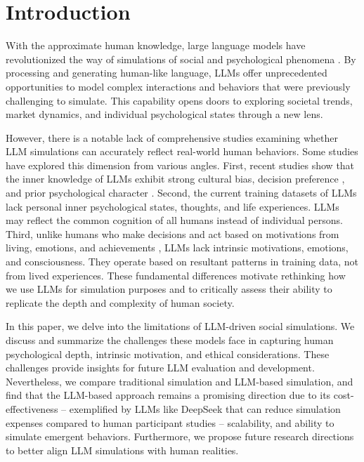 \section{Introduction} \label{intro}
With the approximate human knowledge, large language models have revolutionized the way of simulations of social and psychological phenomena \citep{Park2023GenerativeAgents, gao2023s}. By processing and generating human-like language, LLMs offer unprecedented opportunities to model complex interactions and behaviors that were previously challenging to simulate. This capability opens doors to exploring societal trends, market dynamics, and individual psychological states through a new lens.

However, there is a notable lack of comprehensive studies examining whether LLM simulations can accurately reflect real-world human behaviors. Some studies have explored this dimension from various angles. First, recent studies \citep{wang2023not, wang2024new, wang2025limits} show that the inner knowledge of LLMs exhibit strong cultural bias, decision preference \citep{huang2024far}, and prior psychological character \citep{pan2023llms}. Second, the current training datasets of LLMs lack personal inner psychological states, thoughts, and life experiences. LLMs may reflect the common cognition of all humans instead of individual persons. Third, unlike humans who make decisions and act based on motivations from living, emotions, and achievements \citep{felin2024theory}, LLMs lack intrinsic motivations, emotions, and consciousness. They operate based on resultant patterns in training data, not from lived experiences. These fundamental differences motivate rethinking how we use LLMs for simulation purposes and to critically assess their ability to replicate the depth and complexity of human society.

In this paper, we delve into the limitations of LLM-driven social simulations. We discuss and summarize the challenges these models face in capturing human psychological depth, intrinsic motivation, and ethical considerations. These challenges provide insights for future LLM evaluation and development. Nevertheless, we compare traditional simulation and LLM-based simulation, and find that the LLM-based approach remains a promising direction due to its cost-effectiveness – exemplified by LLMs like DeepSeek that can reduce simulation expenses compared to human participant studies \citep{bi2024deepseek, guo2025deepseek} – scalability, and ability to simulate emergent behaviors. Furthermore, we propose future research directions to better align LLM simulations with human realities.